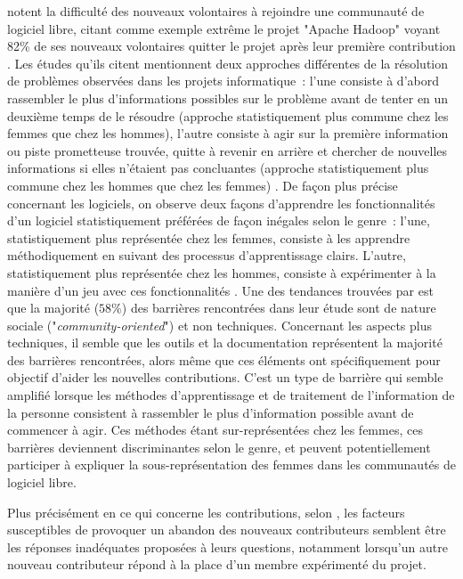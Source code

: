 \documentclass[dvipsnames]{llncs}
\newcommand{\en}[1]{\foreignlanguage{english}{\todo{fix weird hspace}\emph{#1}}}
\begin{document}
    \textcite{barriers-2018} notent la difficulté des nouveaux volontaires à rejoindre une communauté de
    logiciel libre, citant comme exemple extrême le projet "Apache Hadoop" voyant 82\% de ses nouveaux
    volontaires quitter le projet après leur première contribution \parencite{hadoop-dropout-2013}. Les études
    qu'ils citent mentionnent deux approches différentes de la résolution de problèmes observées dans les
    projets informatique : l'une consiste à d'abord rassembler le plus d'informations possibles sur le
    problème avant de tenter en un deuxième temps de le résoudre (approche statistiquement plus commune chez
    les femmes que chez les hommes), l'autre consiste à agir sur la première information ou piste prometteuse
    trouvée, quitte à revenir en arrière et chercher de nouvelles informations si elles n'étaient pas
    concluantes (approche statistiquement plus commune chez les hommes que chez les femmes)
    \parencite{gender-information-processing-1995,gender-information-processing-2015}. De façon plus précise
    concernant les logiciels, on observe deux façons d'apprendre les fonctionnalités d'un logiciel
    statistiquement préférées de façon inégales selon le genre : l'une, statistiquement plus représentée chez
    les femmes, consiste à les apprendre méthodiquement en suivant des processus d'apprentissage clairs.
    L'autre, statistiquement plus représentée chez les hommes, consiste à expérimenter à la manière d'un jeu
    avec ces fonctionnalités \parencite{gender-programming-2010,gender-programming-2006}. Une des tendances
    trouvées par \textcite[p.~1008]{barriers-2018} est que la majorité ($58\%$) des barrières rencontrées dans
    leur étude sont de nature sociale ("\en{community-oriented}") et non techniques. Concernant les aspects
    plus techniques, il semble que les outils et la documentation représentent la majorité des barrières
    rencontrées, alors même que ces éléments ont spécifiquement pour objectif d'aider les nouvelles
    contributions. C'est un type de barrière qui semble amplifié lorsque les méthodes d'apprentissage et de
    traitement de l'information de la personne consistent à rassembler le plus d'information possible avant de
    commencer à agir. Ces méthodes étant sur-représentées chez les femmes, ces barrières deviennent
    discriminantes selon le genre, et peuvent potentiellement participer à expliquer la sous-représentation
    des femmes dans les communautés de logiciel libre.

    Plus précisément en ce qui concerne les contributions, selon \textcite{hadoop-dropout-2013}, les facteurs
    susceptibles de provoquer un abandon des nouveaux contributeurs semblent être les réponses inadéquates
    proposées à leurs questions, notamment lorsqu'un autre nouveau contributeur répond à la place d'un membre
    expérimenté du projet.
\end{document}
